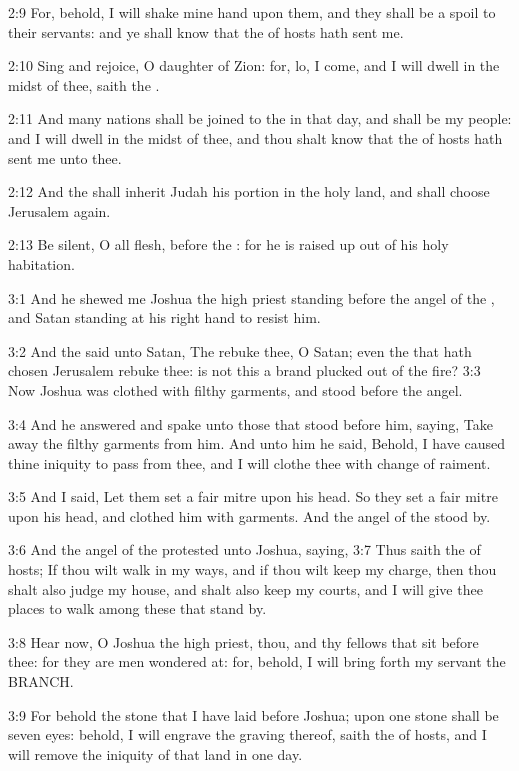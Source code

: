 2:9 For, behold, I will shake mine hand upon them, and they shall be a spoil to their servants: and ye shall know that the \LORD of hosts hath sent me.

2:10 Sing and rejoice, O daughter of Zion: for, lo, I come, and I will dwell in the midst of thee, saith the \LORD.

2:11 And many nations shall be joined to the \LORD in that day, and shall be my people: and I will dwell in the midst of thee, and thou shalt know that the \LORD of hosts hath sent me unto thee.

2:12 And the \LORD shall inherit Judah his portion in the holy land, and shall choose Jerusalem again.

2:13 Be silent, O all flesh, before the \LORD: for he is raised up out of his holy habitation.

3:1 And he shewed me Joshua the high priest standing before the angel of the \LORD, and Satan standing at his right hand to resist him.

3:2 And the \LORD said unto Satan, The \LORD rebuke thee, O Satan; even the \LORD that hath chosen Jerusalem rebuke thee: is not this a brand plucked out of the fire?  3:3 Now Joshua was clothed with filthy garments, and stood before the angel.

3:4 And he answered and spake unto those that stood before him, saying, Take away the filthy garments from him. And unto him he said, Behold, I have caused thine iniquity to pass from thee, and I will clothe thee with change of raiment.

3:5 And I said, Let them set a fair mitre upon his head. So they set a fair mitre upon his head, and clothed him with garments. And the angel of the \LORD stood by.

3:6 And the angel of the \LORD protested unto Joshua, saying, 3:7 Thus saith the \LORD of hosts; If thou wilt walk in my ways, and if thou wilt keep my charge, then thou shalt also judge my house, and shalt also keep my courts, and I will give thee places to walk among these that stand by.

3:8 Hear now, O Joshua the high priest, thou, and thy fellows that sit before thee: for they are men wondered at: for, behold, I will bring forth my servant the BRANCH.

3:9 For behold the stone that I have laid before Joshua; upon one stone shall be seven eyes: behold, I will engrave the graving thereof, saith the \LORD of hosts, and I will remove the iniquity of that land in one day.


